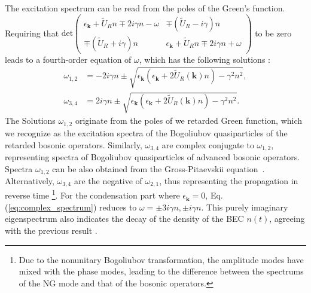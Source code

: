 \documentclass[aps,prl,twocolumn,superscriptaddress,]{revtex4-1}
\newcommand{\tmmathbf}[1]{\ensuremath{\boldsymbol{#1}}}
\begin{document}
\begin{comment}
\caption{The peak frequency of the spectral function $A$ of the dissipative
BEC (\ref{eq:spectrum_function}) as a function of the  kinetic energy
$\epsilon=\frac{|\bm{k}|^{2}}{2m}$ in different limits and different
directions. Here we choose $\epsilon_{dd}=0.83.$ Figures a,c and e show the strong repulsive interaction limit where $U_{R}n=1.0$ a.u. and  $\gamma n=0.1$ a.u.. Figures b,d and f show the strong dissipation
limit where $U_{R}n=0.1$ a.u. and $\gamma n=1.0$ a.u.. From top to
bottom, the directions are $\theta=0,\pi/4,\pi/2$.
In the regime $\tilde{U}_{R}\gg\gamma$, $\omega_{\mathrm{peak}}$
exhibits behavior initially following a square-root trent and subsequently
transitioning to a linear relationship with $\epsilon$, consistent
with the spectrum of the interacting BEC in a closed system. In the
strong dissipation regime, the peak is less sensitive to the direction
and shows a bending at $\epsilon=1.0$ a.u. where the real part of the
spectrum increases. }

\label{fig1}
\end{figure}
\end{comment}
The excitation spectrum can be read from the poles of the Green's function. Requiring that $\mathrm{det}\begin{pmatrix}\epsilon_{\tmmathbf{k}}+\tilde{U}_Rn\mp2i\gamma n-\omega & \mp(\tilde{U}_R-i\gamma)n\\
	\mp(\tilde{U}_R+i\gamma)n & \epsilon_{\tmmathbf{k}}+\tilde{U}_Rn\mp2i\gamma n+\omega
	\end{pmatrix}$ to be zero leads to a fourth-order equation of $\omega$, which
has the following solutions \citep{SupplementaryMaterial}:
\begin{equation}
\begin{aligned}\omega_{1,2} & =-2i\gamma n\pm\sqrt{\epsilon_{\tmmathbf{k}}(\epsilon_{\tmmathbf{k}}+2\tilde{U}_{R}(\bm{k})n)-\gamma^{2}n^{2}},\\
\omega_{3,4} & =2i\gamma n\pm\sqrt{\epsilon_{\tmmathbf{k}}(\epsilon_{\tmmathbf{k}}+2\tilde{U}_{R}(\bm{k})n)-\gamma^{2}n^{2}}.
\end{aligned}
\label{eq:complex_spectrum}
\end{equation}
The Solutions $\omega_{1,2}$ originate from the poles of we retarded Green function, which we recognize as the excitation
spectra of the Bogoliubov quasiparticles of the retarded bosonic operators. Similarly, $\omega_{3,4}$
are complex conjugate to $\omega_{1,2}$, representing spectra of
Bogoliubov quasiparticles of advanced bosonic operators. Spectra $\omega_{1,2}$ can be also obtained from the Gross-Pitaevskii equation~\cite{liu2022weakly}. Alternatively,
$\omega_{3,4}$ are the negative of $\omega_{2,1}$, thus representing
the propagation in reverse time \footnote{Due to the nonunitary Bogoliubov transformation, the amplitude modes have mixed with the phase modes, leading to the difference between the spectrums of the NG mode and that of the bosonic operators.}. For the condensation part where $\epsilon_{\tmmathbf{k}}=0$,
Eq. (\ref{eq:complex_spectrum}) reduces to $\omega=\pm3i\gamma n,\pm i\gamma n$.
This purely imaginary eigenspectrum also indicates the decay of the
density of the BEC $n(t)$, agreeing with the previous result \cite{Ce2022}.  
\end{document}
